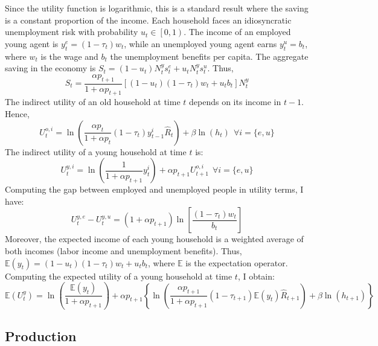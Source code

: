 Since the utility function is logarithmic, this is a standard result where the saving is a constant proportion of the income.
Each household faces an idiosyncratic unemployment risk with probability $u_t \in \left[0,1\right)$. The income of an employed young agent is $y^e_t = (1-\tau_t)w_t$, while an unemployed young agent earns $y^u_t = b_t$, where $w_t$ is the wage and $b_t$ the unemployment benefits per capita. The aggregate saving in the economy is $S_t = (1-u_t) N_t^y s^e_t + u_t N_t^y s^u_t$. Thus,
	\begin{equation}\label{eq:agg_saving}
		S_t = \frac{\alpha p_{t+1}}{1+\alpha p_{t+1}}\left[ (1-u_t)(1-\tau_t)w_t + u_t b_t \right] N_t^y
	\end{equation}
The indirect utility of an old household at time $t$ depends on its income in $t-1$. Hence,
	\begin{equation}\label{eq:utility_old}
		U_t^{o,i} = \ln\left(\frac{\alpha p_t}{1+\alpha p_t}(1-\tau_t)y_{t-1}^i\hat{R}_t\right) + \beta \ln(h_t) ~~ \forall i = \lbrace e,u \rbrace
	\end{equation}
The indirect utility of a young household at time $t$ is:
	\begin{equation*}\label{eq:utility_young}
		U_t^{y,i} = \ln\left(\frac{1}{1+\alpha p_{t+1}}y_t^i\right)+ \alpha p_{t+1} U_{t+1}^{o,i} ~~ \forall i = \lbrace e,u \rbrace
	\end{equation*}
Computing the gap between employed and unemployed people in utility terms, I have:
	\begin{equation}\label{eq:utility_young_gap}
		U_t^{y,e} - U_t^{y,u} = (1+\alpha p_{t+1})\ln\left[\frac{(1-\tau_t)w_t}{b_t}\right]
	\end{equation}
Moreover, the expected income of each young household is a weighted average of both incomes (labor income and unemployment benefits). Thus, $\mathbb{E}(y_t) = (1-u_t)(1-\tau_t)w_t + u_tb_t$, where $\mathbb{E}$ is the expectation operator. Computing the expected utility of a young household at time $t$, I obtain:
	\begin{equation}\label{eq:expected_utility_young}
		\mathbb{E}({U}_t^y) = \ln\left(\frac{\mathbb{E}\left(y_t\right)}{1+\alpha p_{t+1}}\right) + \alpha p_{t+1}\left\lbrace \ln\left(\frac{\alpha p_{t+1}}{1+\alpha p_{t+1}}(1-\tau_{t+1})\mathbb{E}(y_t)\hat{R}_{t+1}\right) + \beta \ln(h_{t+1}) \right\rbrace
	\end{equation}

\subsection{Production}\label{subsec:production}


